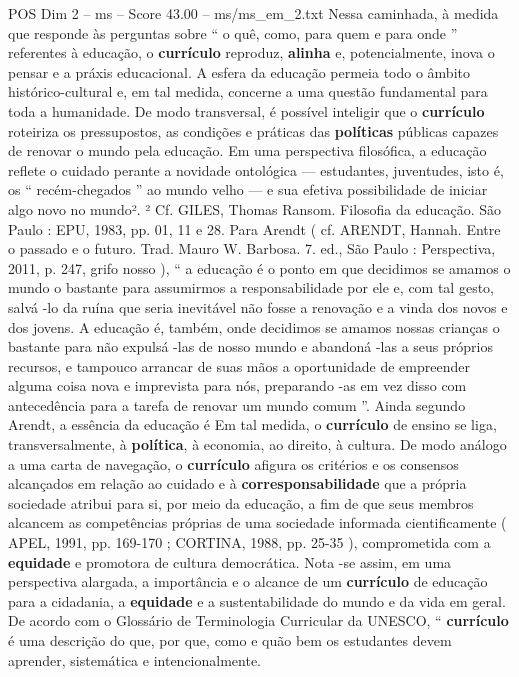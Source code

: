 \begin{textsample}{POS Dim 2 – ms – Score 43.00 – ms/ms\_em\_2.txt}
Nessa caminhada, à medida que responde às perguntas sobre “ o quê, como, para quem e para onde ” referentes à educação, o \textbf{currículo} reproduz, \textbf{alinha} e, potencialmente, inova o pensar e a práxis educacional.
A esfera da educação permeia todo o âmbito histórico-cultural e, em tal medida, concerne a uma questão fundamental para toda a humanidade.
De modo transversal, é possível inteligir que o \textbf{currículo} roteiriza os pressupostos, as condições e práticas das \textbf{políticas} públicas capazes de renovar o mundo pela educação.
Em uma perspectiva filosófica, a educação reflete o cuidado perante a novidade ontológica — estudantes, juventudes, isto é, os “ recém-chegados ” ao mundo velho — e sua efetiva possibilidade de iniciar algo novo no mundo². ² Cf.
GILES, Thomas Ransom.
Filosofia da educação.
São Paulo : EPU, 1983, pp. 01, 11 e 28.
Para Arendt ( cf.
ARENDT, Hannah.
Entre o passado e o futuro.
Trad.
Mauro W.
Barbosa. 7. ed., São Paulo : Perspectiva, 2011, p. 247, grifo nosso ), “ a educação é o ponto em que decidimos se amamos o mundo o bastante para assumirmos a responsabilidade por ele e, com tal gesto, salvá -lo da ruína que seria inevitável não fosse a renovação e a vinda dos novos e dos jovens.
A educação é, também, onde decidimos se amamos nossas crianças o bastante para não expulsá -las de nosso mundo e abandoná -las a seus próprios recursos, e tampouco arrancar de suas mãos a oportunidade de empreender alguma coisa nova e imprevista para nós, preparando -as em vez disso com antecedência para a tarefa de renovar um mundo comum ”.
Ainda segundo Arendt, a essência da educação é Em tal medida, o \textbf{currículo} de ensino se liga, transversalmente, à \textbf{política}, à economia, ao direito, à cultura.
De modo análogo a uma carta de navegação, o \textbf{currículo} afigura os critérios e os consensos alcançados em relação ao cuidado e à \textbf{corresponsabilidade} que a própria sociedade atribui para si, por meio da educação, a fim de que seus membros alcancem as competências próprias de uma sociedade informada cientificamente ( APEL, 1991, pp. 169-170 ; CORTINA, 1988, pp. 25-35 ), comprometida com a \textbf{equidade} e promotora de cultura democrática.
Nota -se assim, em uma perspectiva alargada, a importância e o alcance de um \textbf{currículo} de educação para a cidadania, a \textbf{equidade} e a sustentabilidade do mundo e da vida em geral.
De acordo com o Glossário de Terminologia Curricular da UNESCO, “ \textbf{currículo} é uma descrição do que, por que, como e quão bem os estudantes devem aprender, sistemática e intencionalmente.

\end{textsample}
